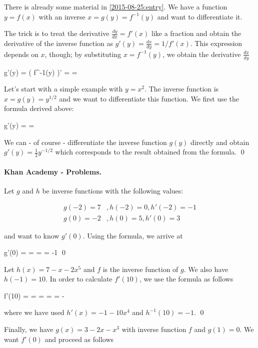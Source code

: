 
There is already some material in \ref{2015-08-25:entry}. We have a function $y = f(x)$ with an inverse $x = g(y) = f^{-1}(y)$ and want to differentiate it.

The trick is to treat the derivative $\frac{dy}{dx} = f'(x)$ like a fraction and obtain the derivative of the inverse function  as $g'(y) = \frac{dx}{dy} = 1 / f'(x)$. This expression depends on $x$, though; by substituting $x=f^{-1}(y)$, we obtain the derivative $\frac{dx}{dy}$ 

\bee
g'(y) = \left( f^{-1}(y) \right)' =  = 
\eee

Let's start with a simple example with $y = x^2$. The inverse function is $x = g(y) = y^{1/2}$ and we want to differentiate this function. We first use the formula derived above:

\bee
g'(y) =  = 
\eee

We can - of course - differentiate the inverse function $g(y)$ directly and obtain $g'(y) = \frac{1}{2} y^{-1/2}$ which corresponds to the result obtained from the formula. \qed

\paragraph{Khan Academy - Problems.} Let $g$ and $h$ be inverse functions with the following values:

\begin{align*}
g(-2) = 7 &, h(-2) = 0, h'(-2) = -1 \\
g(0) = -2 &, h(0) = 5, h'(0) = 3
\end{align*}

and want to know $g'(0)$. Using the formula, we arrive at

\bee
g'(0) =  =  =  = -1 \qed
\eee

Let $h(x) = 7 - x - 2x^5$ and $f$ is the inverse function of $g$. We also have $h(-1) = 10$. In order to calculate $f'(10)$, we use the formula as follows

\bee
f'(10) =  =  =  =  = - 
\eee

where we have used $h'(x) = -1-10x^4$ and $h^{-1}(10) = -1$. \qed

Finally, we have $g(x) = 3-2x-x^3$ with inverse function $f$ and $g(1) = 0$. We want $f'(0)$ and proceed as follows

